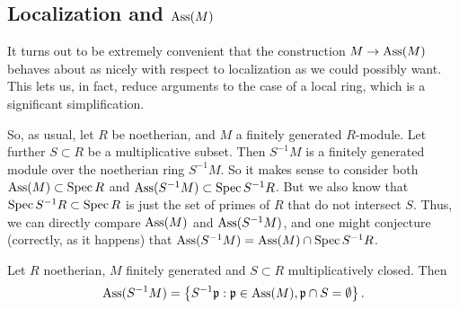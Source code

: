 \subsection{Localization and $\operatorname{Ass}(M)$}

It turns out to be extremely convenient that the construction $M  \to \operatorname{Ass}(M)$
behaves about as nicely with respect to localization as we could possibly
want. This lets us, in fact, reduce arguments to the case of a local ring,
which is a significant simplification.

So, as usual, let $R $ be noetherian, and $M$ a finitely generated $R$-module. 
Let further $S \subset R$ be a multiplicative subset. 
Then $S^{-1}M$ is a finitely generated module over the noetherian ring
$S^{-1}M$. So it makes sense to consider both $\operatorname{Ass}(M) \subset \operatorname{Spec} R$ and
$\operatorname{Ass}(S^{-1}M) \subset \operatorname{Spec} S^{-1}R$. But we also know that $\operatorname{Spec} S^{-1}R
\subset \operatorname{Spec} R$ is just the set of primes of $R$ that do not intersect $S$.
Thus, we can directly compare $\operatorname{Ass}(M)$ and $\operatorname{Ass}(S^{-1}M)$, and one might
conjecture (correctly, as it happens) that $\operatorname{Ass}(S^{-1}M) = \operatorname{Ass}(M) \cap \operatorname{Spec}
S^{-1}R$.
\begin{proposition} \label{assmlocalization}
Let $R$ noetherian, $M$ finitely generated and $S \subset R$ multiplicatively closed. 
Then 
\[ \operatorname{Ass}(S^{-1}M)  = \left\{S^{-1}\mathfrak{p}: \mathfrak{p} \in \operatorname{Ass}(M),
\mathfrak{p}\cap S  = \emptyset \right\} . \]
\end{proposition} 
